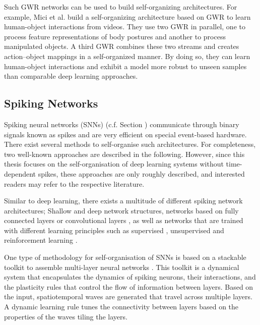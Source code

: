 Such GWR networks can be used to build self-organizing architectures.
For example, Mici et al.  build a self-organizing architecture based on GWR to learn human-object interactions from videos.
They use two GWR in parallel, one to process feature representations of body postures and another to process manipulated objects.
A third GWR combines these two streams and creates action–object mappings in a self-organized manner.
By doing so, they can learn human-object interactions and exhibit a model more robust to unseen samples than comparable deep learning approaches.


\subsection{Spiking Networks}
Spiking neural networks (SNNs) (c.f. Section ) communicate through binary signals known as spikes and are very efficient on special event-based hardware.
There exist several methods to self-organise such architectures.
For completeness, two well-known approaches are described in the following.
However, since this thesis focuses on the self-organisation of deep learning systems without time-dependent spikes, these approaches are only roughly described, and interested readers may refer to the respective literature.

Similar to deep learning, there exists a multitude of different spiking network architectures; Shallow  and deep  network structures, networks based on fully connected layers  or convolutional layers , as well as networks that are trained with different learning principles such as supervised , unsupervised  and reinforcement learning .

One type of methodology for self-organisation of SNNs is based on a stackable toolkit to assemble multi-layer neural networks .
This toolkit is a dynamical system that encapsulates the dynamics of spiking neurons, their interactions, and the plasticity rules that control the flow of information between layers.
Based on the input, spatiotemporal waves are generated that travel across multiple layers.
A dynamic learning rule tunes the connectivity between layers based on the properties of the waves tiling the layers.

